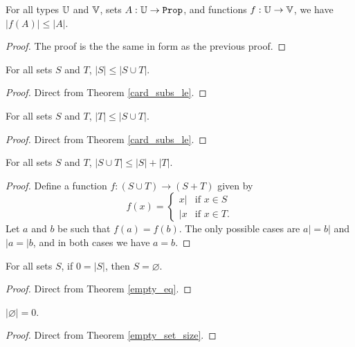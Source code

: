 \documentclass[../../math.tex]{subfiles}
\begin{document}
\begin{theorem} \label{image_under_le}
    For all types $\mathbb{U}$ and $\mathbb{V}$, sets $A : \U \to \Prop$, and functions $f : \mathbb{U}
    \to \mathbb{V}$, we have $|f(A)| \leq |A|$.
\end{theorem}
\begin{proof}
    The proof is the the same in form as the previous proof.
\end{proof}

\begin{theorem} \label{card_union_left}
    For all sets $S$ and $T$, $|S| \leq |S \cup T|$.
\end{theorem}
\begin{proof}
    Direct from Theorem \ref{card_subs_le}.
\end{proof}

\begin{theorem} \label{card_union_right}
    For all sets $S$ and $T$, $|T| \leq |S \cup T|$.
\end{theorem}
\begin{proof}
    Direct from Theorem \ref{card_subs_le}.
\end{proof}

\begin{theorem} \label{card_plus_union}
    For all sets $S$ and $T$, $|S \cup T| \leq |S| + |T|$.
\end{theorem}
\begin{proof}
    Define a function $f : (S \cup T) \to (S + T)$ given by
    \[
        f(x) = \begin{cases}
            x| & \text{if $x \in S$} \\
            |x & \text{if $x \in T$.}
        \end{cases}
    \]
    Let $a$ and $b$ be such that $f(a) = f(b)$.  The only possible cases are $a|
    = b|$ and $|a = |b$, and in both cases we have $a = b$.
\end{proof}

\begin{theorem} \label{zero_is_empty}
    For all sets $S$, if $0 = |S|$, then $S = \varnothing$.
\end{theorem}
\begin{proof}
    Direct from Theorem \ref{empty_eq}.
\end{proof}

\begin{theorem} \label{empty_set_size}
    $|\varnothing| = 0$.
\end{theorem}
\begin{proof}
    Direct from Theorem \ref{empty_set_size}.
\end{proof}
\end{document}
